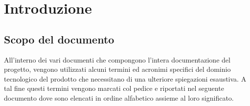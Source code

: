 \newpage
\section{Introduzione}

\subsection{Scopo del documento}
All'interno dei vari documenti che compongono l'intera documentazione del progetto, vengono utilizzati alcuni termini ed acronimi specifici del dominio tecnologico del prodotto che necessitano di una ulteriore spiegazioni esaustiva. A tal fine questi termini vengono marcati col pedice  e riportati nel seguente documento dove sono elencati in ordine alfabetico assieme al loro significato.
